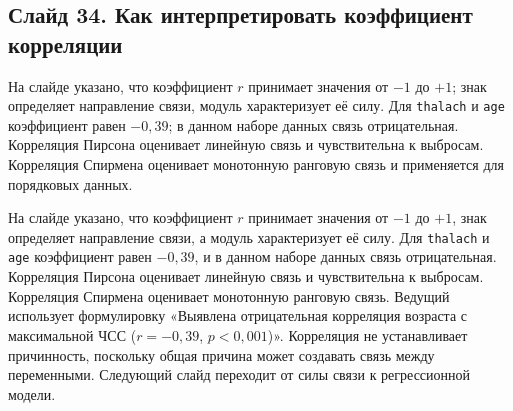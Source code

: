 \documentclass[11pt,a4paper]{article}
\begin{document}
\subsection*{Слайд 34. Как интерпретировать коэффициент корреляции}
\begin{onslide}
На слайде указано, что коэффициент $r$ принимает значения от $-1$ до $+1$; знак определяет направление связи, модуль характеризует её силу. Для \texttt{thalach} и \texttt{age} коэффициент равен $-0{,}39$; в данном наборе данных связь отрицательная. Корреляция Пирсона оценивает линейную связь и чувствительна к выбросам. Корреляция Спирмена оценивает монотонную ранговую связь и применяется для порядковых данных.
\end{onslide}
На слайде указано, что коэффициент $r$ принимает значения от $-1$ до $+1$, знак определяет направление связи, а модуль характеризует её силу. Для \texttt{thalach} и \texttt{age} коэффициент равен $-0{,}39$, и в данном наборе данных связь отрицательная. Корреляция Пирсона оценивает линейную связь и чувствительна к выбросам. Корреляция Спирмена оценивает монотонную ранговую связь. Ведущий использует формулировку «Выявлена отрицательная корреляция возраста с максимальной ЧСС ($r = -0{,}39$, $p < 0{,}001$)». Корреляция не устанавливает причинность, поскольку общая причина может создавать связь между переменными. Следующий слайд переходит от силы связи к регрессионной модели.
\end{document}
